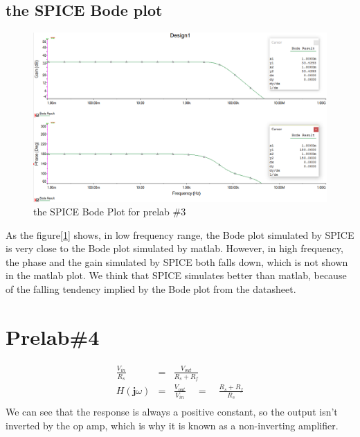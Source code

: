 \documentclass{IEEEtran}
\begin{document}
	\subsection{the SPICE Bode plot}
	\begin{figure}[!htbp]
		\centering
		\begin{framed}
			\includegraphics[width=\linewidth]{images/3_2.PNG}
			\caption{the SPICE Bode Plot for prelab \#3}
			\label{fig:302}
		\end{framed}
	\end{figure}
	\phantom{ } As the figure[\ref{fig:302}] shows, in low frequency range, the Bode plot simulated by SPICE is very close to the Bode plot simulated by matlab. However, in high frequency, the phase and the gain simulated by SPICE both falls down, which is not shown in the matlab plot. We think that SPICE simulates better than matlab, because of the falling tendency implied by the Bode plot from the datasheet. 
	\section{\textbf{Prelab\#4}}
	\begin{eqnarray*}
		\frac{V_{in}}{R_s} & = & \frac{V_{out}}{R_s + R_f}\\
		H(\mathbf{j}\omega) & = & \frac{V_{out}}{V_{in}} \quad = \quad \frac{R_s+R_f}{R_s}\\
	\end{eqnarray*}
	\phantom{ } We can see that the response is always a positive constant, so the output isn't inverted by the op amp, which is why it is known as a non-inverting amplifier.
	
\end{document}
